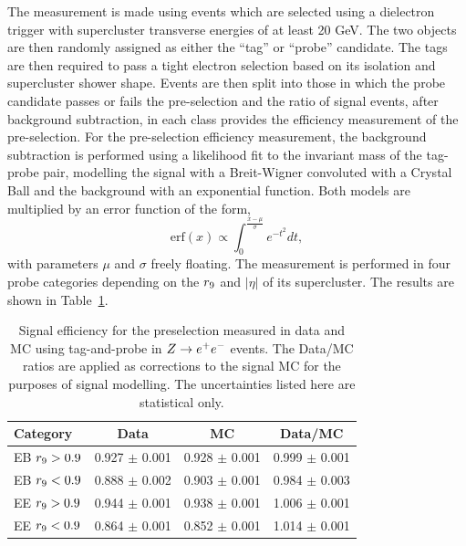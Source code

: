 The measurement is made using events which are selected using a dielectron
trigger with supercluster transverse energies of at least 20 GeV. The two objects are then 
randomly assigned as either the ``tag'' or ``probe'' candidate. The tags are then required to 
pass a tight electron selection based on its isolation and supercluster shower shape.
Events are then split into those in which the probe candidate passes or fails the pre-selection
and the ratio of signal events, after background subtraction, in each class provides the 
efficiency measurement of the pre-selection. For the pre-selection efficiency measurement, 
the background subtraction is performed using a likelihood fit to the invariant 
mass of the tag-probe pair, modelling the signal with a Breit-Wigner convoluted with a 
Crystal Ball and the background with an exponential function. 
Both models are multiplied by an error function of the form,
\begin{equation}
\mathrm{erf}(x)\propto \int_{0}^{\frac{x-\mu}{\sigma}} e^{-t^{2}}dt,
\end{equation}
with parameters $\mu$ and $\sigma$ freely floating. The measurement is performed
in four probe categories depending on the $r_{9}$ and $|\eta|$ of its supercluster.
The results are shown in Table~\ref{tab:sigeffpresel}. 

\begin{table}
\begin{tabular}{| l | c | c | c |}
\hline
\textbf{Category} & \textbf{Data} & \textbf{MC} & \textbf{Data/MC} \\
\hline
EB $r_{9}>0.9$ & 0.927 $\pm$ 0.001 & 0.928 $\pm$ 0.001 &0.999 $\pm$ 0.001 \\
EB $r_{9}<0.9$ & 0.888 $\pm$ 0.002 & 0.903 $\pm$ 0.001 &0.984 $\pm$ 0.003 \\
EE $r_{9}>0.9$ & 0.944 $\pm$ 0.001 & 0.938 $\pm$ 0.001 &1.006 $\pm$ 0.001 \\
EE $r_{9}<0.9$ & 0.864 $\pm$ 0.001 & 0.852 $\pm$ 0.001 &1.014 $\pm$ 0.001 \\
\hline
\end{tabular}
\caption{Signal efficiency for the preselection measured in data and MC using tag-and-probe in
$Z\rightarrow e^{+}e^{-}$ events. The Data/MC ratios are applied as corrections to the signal MC for the purposes
of signal modelling. The uncertainties listed here are statistical only.}
\label{tab:sigeffpresel}
\end{table}

